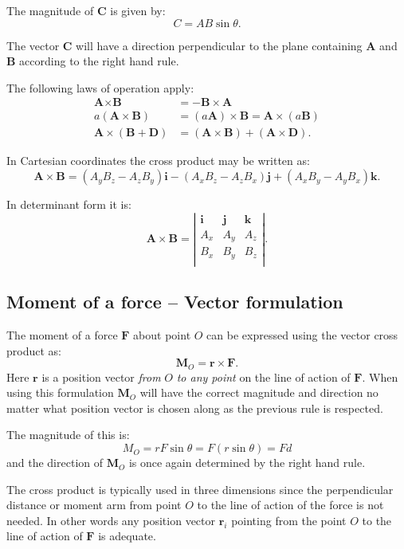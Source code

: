 The magnitude of $\textbf{C}$ is given by:
\[ 
C = AB \sin \theta
.\]

The vector $\textbf{C}$ will have a direction perpendicular to the plane containing $\textbf{A}$ and $\textbf{B}$ according to the right hand rule.

The following laws of operation apply:
\begin{align*}
  \textbf{A} \times \textbf{B} &= - \textbf{B} \times \textbf{A} \\
  a \left( \textbf{A} \times \textbf{B} \right) &= (a \textbf{A}) \times \textbf{B} = \textbf{A} \times \left( a \textbf{B} \right) \\
  \textbf{A} \times \left( \textbf{B} + \textbf{D} \right) &= \left( \textbf{A} \times \textbf{B} \right) + \left( \textbf{A} \times \textbf{D} \right)
.\end{align*}

In Cartesian coordinates the cross product may be written as:
\[ 
\textbf{A} \times \textbf{B} = \left( A_y B_z - A_z B_y \right) \textbf{i} - \left( A_x B_z - A_z B_x \right) \textbf{j} + \left( A_x B_y - A_y B_x \right) \textbf{k}
.\]

In determinant form it is:
\[ 
\textbf{A} \times \textbf{B} = \left| \begin{array}{ccc}
\textbf{i} & \textbf{j} & \textbf{k}\\
A_x & A_y & A_z\\
B_x & B_y & B_z\\
\end{array} \right|
.\]

\subsection{Moment of a force -- Vector formulation}
The moment of a force $\textbf{F}$ about point $O$ can be expressed using the vector cross product as:
\[ 
\textbf{M}_O = \textbf{r} \times \textbf{F}
.\]
Here $\textbf{r}$ is a position vector \textit{from} $O$ \textit{to any point} on the line of action of $\textbf{F}$. When using this formulation $\textbf{M}_O$ will have the correct magnitude and direction no matter what position vector is chosen along as the previous rule is respected.

The magnitude of this is:
\[ 
M_O = r F \sin \theta = F \left( r \sin \theta \right) = Fd
\]
and the direction of $\textbf{M}_O$ is once again determined by the right hand rule. 

The cross product is typically used in three dimensions since the perpendicular distance or moment arm from point $O$ to the line of action of the force is not needed. In other words any position vector $\textbf{r}_i$ pointing from the point $O$ to the line of action of $\textbf{F}$ is adequate. 

